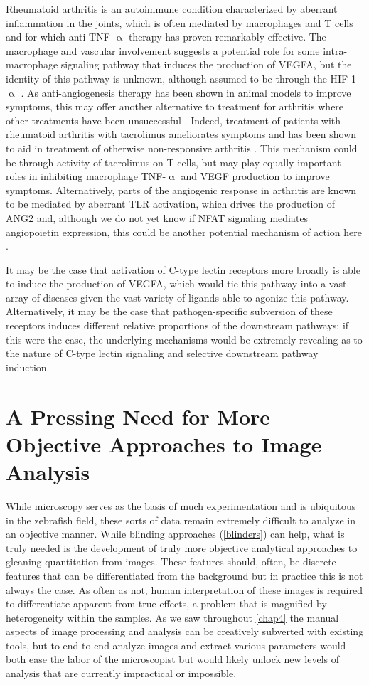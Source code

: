 Rheumatoid arthritis is an autoimmune condition characterized by aberrant inflammation in the joints, which is often mediated by macrophages and T cells and for which anti-TNF-$\upalpha$ therapy has proven remarkably effective. The macrophage and vascular involvement suggests a potential role for some intra-macrophage signaling pathway that induces the production of VEGFA, but the identity of this pathway is unknown, although assumed to be through the HIF-1$\upalpha$ \citep{MacDonald2018}. As anti-angiogenesis therapy has been shown in animal models to improve symptoms, this may offer another alternative to treatment for arthritis where other treatments have been unsuccessful \citep{Paleolog2002, Elshabrawy2015}. Indeed, treatment of patients with rheumatoid arthritis with tacrolimus ameliorates symptoms and has been shown to aid in treatment of otherwise non-responsive arthritis \citep{Dutta2011}. This mechanism could be through activity of tacrolimus on T cells, but may play equally important roles in inhibiting macrophage TNF-$\upalpha$ and VEGF production to improve symptoms. Alternatively, parts of the angiogenic response in arthritis are known to be mediated by aberrant TLR activation, which drives the production of ANG2 and, although we do not yet know if NFAT signaling mediates angiopoietin expression, this could be another potential mechanism of action here \citep{Saber2011}.

It may be the case that activation of C-type lectin receptors more broadly is able to induce the production of VEGFA, which would tie this pathway into a vast array of diseases given the vast variety of ligands able to agonize this pathway. Alternatively, it may be the case that pathogen-specific subversion of these receptors induces different relative proportions of the downstream pathways; if this were the case, the underlying mechanisms would be extremely revealing as to the nature of C-type lectin signaling and selective downstream pathway induction. 

\section{A Pressing Need for More Objective Approaches to Image Analysis}

While microscopy serves as the basis of much experimentation and is ubiquitous in the zebrafish field, these sorts of data remain extremely difficult to analyze in an objective manner. While blinding approaches (\autoref{blinders}) can help, what is truly needed is the development of truly more objective analytical approaches to gleaning quantitation from images. These features should, often, be discrete features that can be differentiated from the background but in practice this is not always the case. As often as not, human interpretation of these images is required to differentiate apparent from true effects, a problem that is magnified by heterogeneity within the samples. As we saw throughout \autoref{chap4} the manual aspects of image processing and analysis can be creatively subverted with existing tools, but to end-to-end analyze images and extract various parameters would both ease the labor of the microscopist but would likely unlock new levels of analysis that are currently impractical or impossible.

